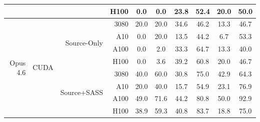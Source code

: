 \begin{table}[]
{\begin{tabular}{@{}rrrrcc|cc|cc@{}}
 &  &  & H100 & \cellcolor[rgb]{1.000,1.000,1.000}0.0 & \cellcolor[rgb]{1.000,1.000,1.000}0.0 & \cellcolor[rgb]{1.000,0.899,0.899}23.8 & \cellcolor[rgb]{1.000,0.644,0.644}52.4 & \cellcolor[rgb]{1.000,0.924,0.924}20.0 & \cellcolor[rgb]{1.000,0.670,0.670}50.0 \\
\midrule
\multirow{16}{*}{Opus 4.6} & \multirow{8}{*}{CUDA} & \multirow{4}{*}{Source-Only} & 3080 & \cellcolor[rgb]{1.000,0.924,0.924}20.0 & \cellcolor[rgb]{1.000,0.924,0.924}20.0 & \cellcolor[rgb]{1.000,0.817,0.817}34.6 & \cellcolor[rgb]{1.000,0.709,0.709}46.2 & \cellcolor[rgb]{1.000,0.960,0.960}13.3 & \cellcolor[rgb]{1.000,0.704,0.704}46.7 \\
 &  &  & A10 & \cellcolor[rgb]{1.000,1.000,1.000}0.0 & \cellcolor[rgb]{1.000,0.924,0.924}20.0 & \cellcolor[rgb]{1.000,0.959,0.959}13.5 & \cellcolor[rgb]{1.000,0.729,0.729}44.2 & \cellcolor[rgb]{1.000,0.987,0.987}6.7 & \cellcolor[rgb]{1.000,0.635,0.635}53.3 \\
 &  &  & A100 & \cellcolor[rgb]{1.000,1.000,1.000}0.0 & \cellcolor[rgb]{1.000,0.998,0.998}2.0 & \cellcolor[rgb]{1.000,0.828,0.828}33.3 & \cellcolor[rgb]{1.000,0.502,0.502}64.7 & \cellcolor[rgb]{1.000,0.960,0.960}13.3 & \cellcolor[rgb]{1.000,0.769,0.769}40.0 \\
 &  &  & H100 & \cellcolor[rgb]{1.000,1.000,1.000}0.0 & \cellcolor[rgb]{1.000,0.995,0.995}3.6 & \cellcolor[rgb]{1.000,0.777,0.777}39.2 & \cellcolor[rgb]{1.000,0.549,0.549}60.8 & \cellcolor[rgb]{1.000,0.924,0.924}20.0 & \cellcolor[rgb]{1.000,0.704,0.704}46.7 \\
\cmidrule(lr){3-10}
 &  & \multirow{4}{*}{Source+SASS} & 3080 & \cellcolor[rgb]{1.000,0.769,0.769}40.0 & \cellcolor[rgb]{1.000,0.558,0.558}60.0 & \cellcolor[rgb]{1.000,0.848,0.848}30.8 & \cellcolor[rgb]{1.000,0.369,0.369}75.0 & \cellcolor[rgb]{1.000,0.742,0.742}42.9 & \cellcolor[rgb]{1.000,0.507,0.507}64.3 \\
 &  &  & A10 & \cellcolor[rgb]{1.000,0.924,0.924}20.0 & \cellcolor[rgb]{1.000,0.769,0.769}40.0 & \cellcolor[rgb]{1.000,0.948,0.948}15.7 & \cellcolor[rgb]{1.000,0.617,0.617}54.9 & \cellcolor[rgb]{1.000,0.904,0.904}23.1 & \cellcolor[rgb]{1.000,0.343,0.343}76.9 \\
 &  &  & A100 & \cellcolor[rgb]{1.000,0.681,0.681}49.0 & \cellcolor[rgb]{1.000,0.414,0.414}71.6 & \cellcolor[rgb]{1.000,0.729,0.729}44.2 & \cellcolor[rgb]{1.000,0.289,0.289}80.8 & \cellcolor[rgb]{1.000,0.670,0.670}50.0 & \cellcolor[rgb]{1.000,0.111,0.111}92.9 \\
 &  &  & H100 & \cellcolor[rgb]{1.000,0.779,0.779}38.9 & \cellcolor[rgb]{1.000,0.567,0.567}59.3 & \cellcolor[rgb]{1.000,0.762,0.762}40.8 & \cellcolor[rgb]{1.000,0.248,0.248}83.7 & \cellcolor[rgb]{1.000,0.931,0.931}18.8 & \cellcolor[rgb]{1.000,0.369,0.369}75.0 \\

\end{tabular}}
\end{table}
